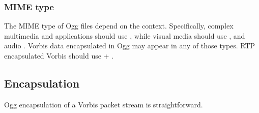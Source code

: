 \subsubsection{MIME type}

The MIME type of Ogg files depend on the context.  Specifically, complex
multimedia and applications should use ,
while visual media should use , and audio
.  Vorbis data encapsulated in Ogg may appear
in any of those types.  RTP encapsulated Vorbis should use
 + .


\subsection{Encapsulation}

Ogg encapsulation of a Vorbis packet stream is straightforward.

